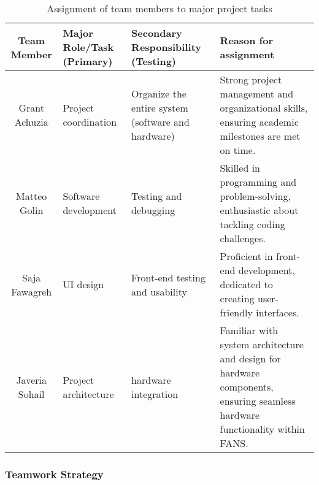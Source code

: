 \begin{table}[H]
    \centering
    \begin{tabular}{| c | p{3cm} | p{4cm} | p{5cm} |}
        \hline
        \textbf{Team Member} & \textbf{Major Role/Task (Primary)} & \textbf{Secondary Responsibility (Testing)}        &
        \textbf{Reason for assignment}                                                                                                                                                                              \\
        \hline
        Grant Achuzia        & Project coordination               & Organize the entire system (software and hardware) & Strong project
        management and organizational skills, ensuring academic milestones are met on time.                                                                                                                         \\
        \hline
        Matteo Golin         & Software development               & Testing and debugging                              & Skilled in programming and problem-solving, enthusiastic about tackling coding challenges. \\
        \hline
        Saja Fawagreh        & UI design                          & Front-end testing and usability                    & Proficient in front-end
        development, dedicated to creating user-friendly interfaces.                                                                                                                                                \\
        \hline
        Javeria Sohail       & Project architecture               & hardware integration                               &
        Familiar with system architecture and design for hardware components, ensuring seamless hardware functionality
        within FANS.                                                                                                                                                                                                \\
        \hline
    \end{tabular}
    \caption{Assignment of team members to major project tasks}
\end{table}

\subsubsection{Teamwork Strategy}

